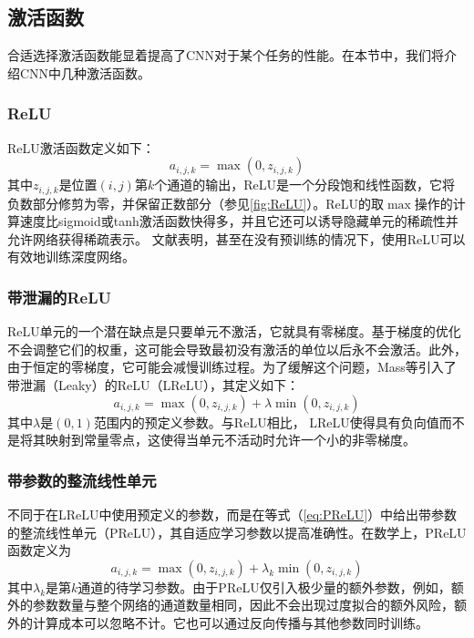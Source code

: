 \subsection{激活函数}
\label{Activationfunctions}
合适选择激活函数能显着提高了CNN对于某个任务的性能。在本节中，我们将介绍CNN中几种激活函数。

\subsubsection{ReLU}

ReLU激活函数定义如下：
\begin{equation}\label{eq:ReLU}
a_{i,j,k}=\max(0,z_{i,j,k})
\end{equation}
其中$ z_{i,j,k} $是位置$ (i,j) $第$k$个通道的输出，ReLU是一个分段饱和线性函数，它将负数部分修剪为零，并保留正数部分（参见\figurename {\ref{fig:ReLU}}）。ReLU的取$ \max $操作的计算速度比sigmoid或tanh激活函数快得多，并且它还可以诱导隐藏单元的稀疏性并允许网络获得稀疏表示。
文献表明，甚至在没有预训练的情况下，使用ReLU可以有效地训练深度网络\cite{Krizhevsky2012}。
\subsubsection{带泄漏的ReLU}

ReLU单元的一个潜在缺点是只要单元不激活，它就具有零梯度。基于梯度的优化不会调整它们的权重，这可能会导致最初没有激活的单位以后永不会激活。此外，由于恒定的零梯度，它可能会减慢训练过程。为了缓解这个问题，Mass等\cite{Maas2013}引入了带泄漏（Leaky）的ReLU（LReLU），其定义如下：
\begin{equation}\label{eq:LReLU}
    a_{i,j,k}=\max(0,z_{i,j,k})+\lambda\min(0,z_{i,j,k})
\end{equation}
其中$ \lambda $是$(0,1)$范围内的预定义参数。与ReLU相比， LReLU使得具有负向值而不是将其映射到常量零点，这使得当单元不活动时允许一个小的非零梯度。
\subsubsection{带参数的整流线性单元}

不同于在LReLU中使用预定义的参数，而是在等式（\ref{eq:PReLU}）中给出带参数的整流线性单元（PReLU），其自适应学习参数以提高准确性。在数学上，PReLU函数定义为
\begin{equation}\label{eq:PReLU}
    a_{i,j,k}=\max(0,z_{i,j,k})+\lambda_k\min(0,z_{i,j,k})
\end{equation}
其中$ \lambda_k $是第$ k $通道的待学习参数。由于PReLU仅引入极少量的额外参数，例如，额外的参数数量与整个网络的通道数量相同，因此不会出现过度拟合的额外风险，额外的计算成本可以忽略不计。它也可以通过反向传播与其他参数同时训练。

